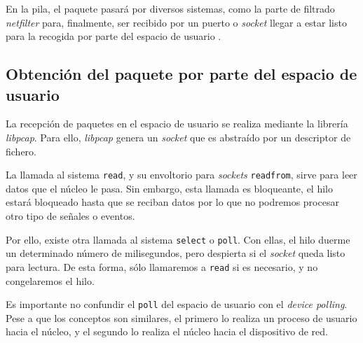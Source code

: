 En la pila, el paquete pasará por diversos sistemas, como la parte de filtrado 
\emph{\gls{netfilter}} para, finalmente, ser recibido por un puerto o \emph{\gls{socket}} llegar a 
estar listo para la recogida por parte del espacio de usuario \cite{p206}.

\subsection{Obtención del paquete por parte del espacio de usuario}
La recepción de paquetes en el espacio de usuario se realiza mediante la librería \emph{\gls{libpcap}}.
Para ello, \emph{\gls{libpcap}} genera un \emph{\gls{socket}} que es abstraído por un descriptor de fichero. 

La llamada al sistema \texttt{read}, y su envoltorio para \emph{sockets} \texttt{readfrom}, sirve para leer datos 
que el núcleo le pasa. Sin embargo, esta llamada es bloqueante, el hilo estará bloqueado hasta que se reciban datos por 
lo que no podremos procesar otro tipo de señales o eventos.

Por ello, existe otra llamada al sistema \texttt{select} o \texttt{poll}. Con ellas, el hilo duerme un determinado 
número de milisegundos, pero despierta si el \emph{\gls{socket}} queda listo para lectura. De esta forma, sólo 
llamaremos a \texttt{read} si es necesario, y no congelaremos el hilo.

Es importante no confundir el \texttt{poll} del espacio de usuario con el \emph{device polling}. Pese a que los 
conceptos son similares, el primero lo realiza un proceso de usuario hacia el núcleo, y el segundo lo realiza el núcleo 
hacia el dispositivo de red.

